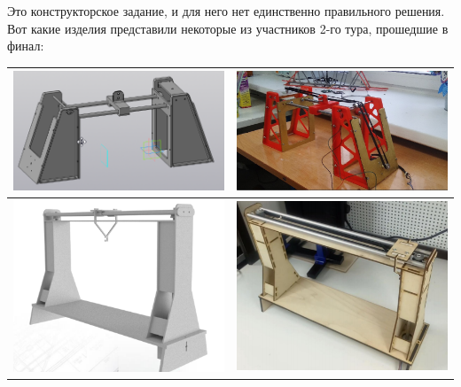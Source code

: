 \solutionSection

Это конструкторское задание, и для него нет единственно правильного решения. Вот какие изделия представили некоторые из участников 2-го тура, прошедшие в финал:

\begin{tabular}{|p{7cm}|p{7cm}|}
    \hline
    \includegraphics[width=7cm]{2} & \includegraphics[width=7cm]{3} \\
    \hline
    \includegraphics[width=7cm]{4} & \includegraphics[width=7cm]{5} \\
    \hline

\end{tabular}
